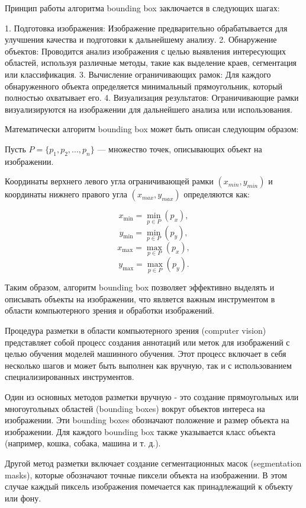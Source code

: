 Принцип работы алгоритма bounding box заключается в следующих шагах:

1. Подготовка изображения: Изображение предварительно обрабатывается для улучшения качества и подготовки к дальнейшему анализу.
2. Обнаружение объектов: Проводится анализ изображения с целью выявления интересующих областей, используя различные методы, такие как выделение краев, сегментация или классификация.
3. Вычисление ограничивающих рамок: Для каждого обнаруженного объекта определяется минимальный прямоугольник, который полностью охватывает его.
4. Визуализация результатов: Ограничивающие рамки визуализируются на изображении для дальнейшего анализа или использования.

Математически алгоритм bounding box может быть описан следующим образом:

Пусть \( P = \{p_1, p_2, ..., p_n\} \) — множество точек, описывающих объект на изображении.

Координаты верхнего левого угла ограничивающей рамки $(x_{min}, y_{min})$ и координаты нижнего правого угла $(x_{max}, y_{max})$ определяются как:

\[ x_{\text{min}} = \min_{p \in P} (p_x), \]
\[ y_{\text{min}} = \min_{p \in P} (p_y), \]
\[ x_{\text{max}} = \max_{p \in P} (p_x), \]
\[ y_{\text{max}} = \max_{p \in P} (p_y). \]

Таким образом, алгоритм bounding box позволяет эффективно выделять и описывать объекты на изображении, что является важным инструментом в области компьютерного зрения и обработки изображений.


Процедура разметки в области компьютерного зрения (computer vision) представляет собой процесс создания аннотаций или меток для изображений с целью обучения моделей машинного обучения. Этот процесс включает в себя несколько шагов и может быть выполнен как вручную, так и с использованием специализированных инструментов.

Один из основных методов разметки вручную - это создание прямоугольных или многоугольных областей (bounding boxes) вокруг объектов интереса на изображении. Эти bounding boxes обозначают положение и размер объекта на изображении. Для каждого bounding box также указывается класс объекта (например, кошка, собака, машина и т. д.).

Другой метод разметки включает создание сегментационных масок (segmentation masks), которые обозначают точные пиксели объекта на изображении. В этом случае каждый пиксель изображения помечается как принадлежащий к объекту или фону.


